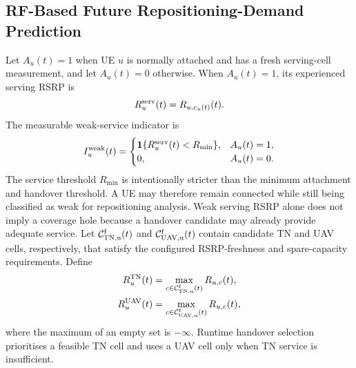 \subsection{RF-Based Future Repositioning-Demand Prediction}

Let $A_u(t)=1$ when UE $u$ is normally attached and has a fresh
serving-cell measurement, and let $A_u(t)=0$ otherwise. When
$A_u(t)=1$, its experienced serving RSRP is
\begin{equation}
 R_u^{\rm serv}(t)=R_{u,c_u(t)}(t).
 \label{eq:serving-rsrp}
\end{equation}
The measurable weak-service indicator is
\begin{equation}
 I_u^{\rm weak}(t)=
 \begin{cases}
 \mathbf{1}\{R_u^{\rm serv}(t)<R_{\min}\},&A_u(t)=1,\\
 0,&A_u(t)=0.
 \end{cases}
 \label{eq:weak-service}
\end{equation}
The service threshold $R_{\min}$ is intentionally stricter than the
minimum attachment and handover threshold. A UE may therefore remain
connected while still being classified as weak for repositioning
analysis.
Weak serving RSRP alone does not imply a coverage hole because a
handover candidate may already provide adequate service. Let
$\mathcal{C}^{\rm f}_{\rm TN,u}(t)$ and
$\mathcal{C}^{\rm f}_{\rm UAV,u}(t)$ contain candidate TN and UAV
cells, respectively, that satisfy the configured RSRP-freshness and
spare-capacity requirements. Define
\begin{align}
 R_u^{\rm TN}(t)&=
 \max_{c\in\mathcal{C}^{\rm f}_{\rm TN,u}(t)}R_{u,c}(t),\\
 R_u^{\rm UAV}(t)&=
 \max_{c\in\mathcal{C}^{\rm f}_{\rm UAV,u}(t)}R_{u,c}(t),
 \label{eq:best-feasible-rsrp}
\end{align}
where the maximum of an empty set is $-\infty$. Runtime handover
selection prioritises a feasible TN cell and uses a UAV cell only
when TN service is insufficient.

